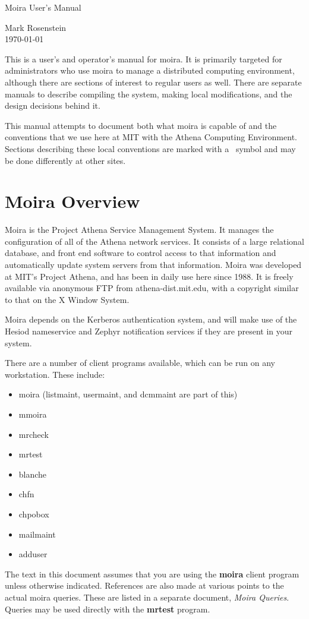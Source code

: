 \documentclass{book}
\begin{document}
\vspace{2 in}
{\Large \hfill Moira User's Manual}

{\large \hfill Mark Rosenstein\\

\hfill \today\\}

\vspace{1 in}
This is a user's and operator's manual for moira.  It is primarily
targeted for administrators who use moira to manage a distributed
computing environment, although there are sections of interest to
regular users as well.  There are separate manuals to describe
compiling the system, making local modifications, and the design
decisions behind it.

This manual attempts to document both what moira is capable of and the
conventions that we use here at MIT with the Athena Computing
Environment.  Sections describing these local conventions are marked
with a \athena\ symbol and may be done differently at other sites.

\chapter{Moira Overview}
\renewcommand{\thepage}{\arabic{page}}
\setcounter{page}{1}

Moira is the Project Athena Service Management System.  It manages the
configuration of all of the Athena network services.  It consists of a
large relational database, and front end software to control access to
that information and automatically update system servers from that
information.  Moira was developed at MIT's Project Athena, and has
been in daily use here since 1988.  It is freely available via
anonymous FTP from athena-dist.mit.edu, with a copyright similar to
that on the X Window System.

Moira depends on the Kerberos authentication system, and will make use
of the Hesiod nameservice and Zephyr notification services if they are
present in your system.

There are a number of client programs available, which can be run on
any workstation.  These include:
\begin{itemize}
\item moira (listmaint, usermaint, and dcmmaint are part of this)
\item mmoira
\item mrcheck
\item mrtest
\item blanche
\item chfn
\item chpobox
\item mailmaint
\item adduser
\end{itemize}
The text in this document assumes that you are using the {\bf moira}
client program unless otherwise indicated.  References are also made
at various points to the actual moira queries.  These are listed in a
separate document, {\em Moira Queries}.  Queries may be used directly
with the {\bf mrtest} program.
\end{document}
